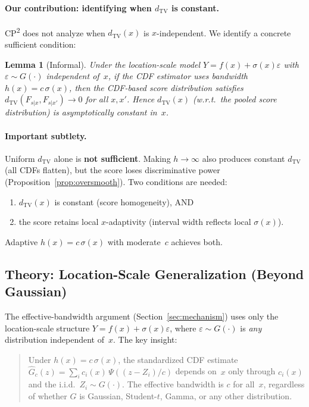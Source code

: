 \documentclass[11pt]{article}
\newtheorem{lemma}{Lemma}
\begin{document}
\paragraph{Our contribution: identifying when $d_{\mathrm{TV}}$ is constant.}
CP\textsuperscript{2} does not analyze when $d_{\mathrm{TV}}(x)$ is
$x$-independent. We identify a concrete sufficient condition:

\begin{lemma}[Informal]
Under the location-scale model $Y = f(x) + \sigma(x)\varepsilon$
with $\varepsilon \sim G(\cdot)$ independent of~$x$, if the CDF
estimator uses bandwidth $h(x) = c\,\sigma(x)$, then the CDF-based
score distribution satisfies
$d_{\mathrm{TV}}(F_{s|x}, F_{s|x'}) \to 0$ for all $x, x'$.
Hence $d_{\mathrm{TV}}(x)$ (w.r.t.\ the pooled score distribution) is
asymptotically constant in~$x$.
\end{lemma}

\paragraph{Important subtlety.}
Uniform $d_{\mathrm{TV}}$ alone is \textbf{not sufficient}. Making
$h \to \infty$ also produces constant $d_{\mathrm{TV}}$ (all CDFs
flatten), but the score loses discriminative power
(Proposition~\ref{prop:oversmooth}). Two conditions are needed:
\begin{enumerate}
  \item $d_{\mathrm{TV}}(x)$ is constant (score homogeneity), AND
  \item the score retains local $x$-adaptivity (interval width reflects
    local $\sigma(x)$).
\end{enumerate}
Adaptive $h(x) = c\,\sigma(x)$ with moderate~$c$ achieves both.

\subsection{Theory: Location-Scale Generalization (Beyond Gaussian)}
\label{sec:loc-scale}

The effective-bandwidth argument (Section~\ref{sec:mechanism}) uses
only the location-scale structure $Y = f(x) + \sigma(x)\varepsilon$,
where $\varepsilon \sim G(\cdot)$ is \emph{any} distribution
independent of~$x$. The key insight:

\begin{quote}
Under $h(x) = c\,\sigma(x)$, the standardized CDF estimate
$\hat G_c(z) = \sum_i c_i(x)\,\Psi((z - Z_i)/c)$ depends on~$x$
only through $c_i(x)$ and the i.i.d.\ $Z_i \sim G(\cdot)$. The
effective bandwidth is $c$ for all~$x$, regardless of whether $G$ is
Gaussian, Student-$t$, Gamma, or any other distribution.
\end{quote}
\end{document}
